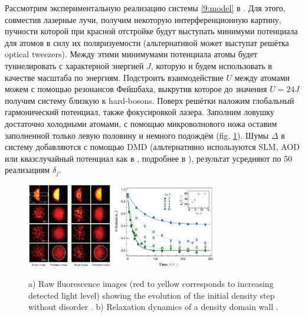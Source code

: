 Рассмотрим экспериментальную реализацию системы \eqref{9:model} в \cite{Choi_2016}. Для этого, совместив лазерные лучи, получим некоторую интерференционную картину, пучности которой при красной отстройке будут выступать минимуми потенциала для атомов в силу их поляризуемости (альтернативой может выступат решётка optical tweezers). Между этими минимумами потенциала атомы будет туннелировать с характерной энергией $J$, которую и будем использовать в качестве масштаба по энергиям.  Подстроить взаимодействие $U$ между атомами можем с помощью резонансов Фейшбаха, выкрутив которое до значения $U=24J$ получим систему близкую к hard-bosons. Поверх решётки наложим глобальный гармонический потенциал, также фокусировкой лазера. Заполним ловушку достаточно холодными атомами, с помощью микроволнового ножа оставим заполненной только левую половину и немного подождём (fig. \ref{fig:loc2D1}). Шумы $\Delta$ в систему добавляются с помощью DMD (альтернативно используются SLM, AOD или квазслучайный потенциал как в \cite{schreiber_observation_2015}, подробнее в \cite{abanin_many-body_2019}), результат усредняют по 50 реализациям $\delta_j$.

\begin{figure}[h]
    \centering
    \includegraphics[align=c, width=0.33\textwidth]{imgs/MBL_2D_exp_1.png}
    \hspace{10 mm} 
    \includegraphics[align=c, width=0.4\textwidth]{imgs/MBL_2D_exp_2.png}
    \caption{
        a) Raw fluorescence images (red to yellow corresponds to increasing detected light level) showing the evolution of the initial density step without disorder \cite{Choi_2016} . 
        b) Relaxation dynamics of a density domain wall \cite{Choi_2016} .
    }
    \label{fig:loc2D1}
\end{figure}



